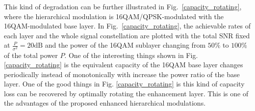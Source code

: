 \documentclass[conference]{IEEEtran}
\begin{document}
This kind of degradation can be further illustrated in
Fig.~\ref{capacity_rotating}, where the hierarchical modulation is
16QAM/QPSK-modulated with the 16QAM-modulated base layer. In
Fig.~\ref{capacity_rotating}, the achievable rates of each layer
and the whole signal constellation are plotted with the total SNR
fixed at $\frac{P}{\sigma^2}=20\mbox{dB}$ and the power of the
16QAM sublayer changing from $50\%$ to $100\%$ of the total power
$P$. One of the interesting things shown in Fig.
\ref{capacity_rotating} is the equivalent capacity of the 16QAM
base layer changes periodically instead of monotonically with
increase the power ratio of the base layer. One of the good things
in Fig. \ref{capacity_rotating} is this kind of capacity loss can
be recovered by optimally rotating the enhancement layer. This is
one of the advantages of the proposed enhanced hierarchical
modulations.
\begin{figure}
\end{figure}
\end{document}
